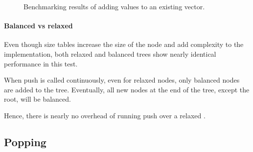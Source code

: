 \begin{figure}[!htbp]
    \caption{Benchmarking results of adding values to an existing vector.}
    \label{fig:push-existing}
\end{figure}


\paragraph{Balanced vs relaxed}  
Even though size tables increase the size of the node and add complexity to the implementation, both relaxed and balanced trees show nearly identical performance in this test.

When push is called continuously, even for relaxed nodes, only balanced nodes are added to the tree. Eventually, all new nodes at the end of the tree, except the root, will be balanced. 

Hence, there is nearly no overhead of running push over a relaxed \rrbvec{}. 

\subsection{Popping}

